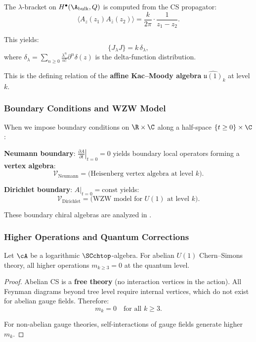 The $\lambda$-bracket on $H^\bullet(\A_{\text{bulk}}, Q)$ is computed from the CS propagator:
\begin{equation}
\langle A_z(z_1) A_{\bar{z}}(z_2) \rangle = \frac{k}{2\pi} \cdot \frac{1}{z_1 - z_2}.
\end{equation}

This yields:
\begin{equation}
\{J_\lambda J\} = k \, \delta_\lambda,
\end{equation}
where $\delta_\lambda = \sum_{n \geq 0} \frac{\lambda^n}{n!} \partial^n \delta(z)$ is the delta-function distribution.

This is the defining relation of the \textbf{affine Kac--Moody algebra} $\widehat{\mathfrak{u}(1)}_k$ at level $k$.

\subsubsection{Boundary Conditions and WZW Model}

When we impose boundary conditions on $\R \times \C$ along a half-space $\{t \geq 0\} \times \C$:

\textbf{Neumann boundary}: $\left. \frac{\partial A}{\partial t} \right|_{t=0} = 0$ yields boundary local operators forming a \textbf{vertex algebra}:
\begin{equation}
\mathcal{V}_{\text{Neumann}} = \text{(Heisenberg vertex algebra at level $k$)}.
\end{equation}

\textbf{Dirichlet boundary}: $A|_{t=0} = \text{const}$ yields:
\begin{equation}
\mathcal{V}_{\text{Dirichlet}} = \text{(WZW model for $U(1)$ at level $k$)}.
\end{equation}

These boundary chiral algebras are analyzed in \cite{CDG20}.

\subsubsection{Higher Operations and Quantum Corrections}

\begin{proposition}
Let\/ $\cA$ be a logarithmic\/ $\SCchtop$-algebra.
For abelian $U(1)$ Chern--Simons theory, all higher operations $m_{k \geq 3} = 0$ at the quantum level.
\end{proposition}

\begin{proof}
Abelian CS is a \textbf{free theory} (no interaction vertices in the action). All Feynman diagrams beyond tree level require internal vertices, which do not exist for abelian gauge fields. Therefore:
\begin{equation}
m_k = 0 \quad \text{for all } k \geq 3.
\end{equation}

For non-abelian gauge theories, self-interactions of gauge fields generate higher $m_k$.
\end{proof}

